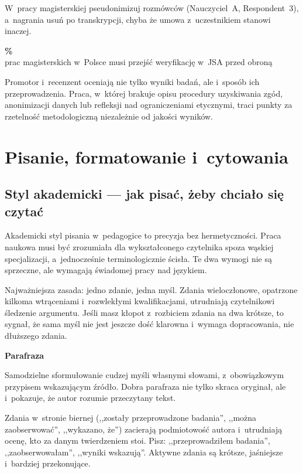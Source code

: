 \documentclass[11pt,a5paper,twoside,openany]{book}
\let\bforigsection\section
\renewcommand{\section}{\needspace{4\baselineskip}\bforigsection}
\newcommand{\bignumber}[2]{%
  \par\vspace{8pt}\noindent\begin{minipage}{\linewidth}\centering
  {\headingfont\bfseries\color{accent}\fontsize{40}{44}\selectfont #1}\\[3pt]
  {\sffamily\small\color{sectioncolor}#2}
  \end{minipage}\vspace{6pt}\par
}
\newcommand{\concept}[2]{%
  \par\vspace{6pt}
  \begin{tcolorbox}[enhanced, breakable, colback=accent!6, colframe=accent,
    boxrule=0pt, leftrule=3.5pt, arc=2pt, drop fuzzy shadow={black!15},
    left=10pt, right=10pt, top=7pt, bottom=7pt, before upper={\parindent0pt}]
    {\sffamily\bfseries\color{accent}#1}\par\vspace{2pt}\small #2
  \end{tcolorbox}\par
}
\begin{document}
 W~pracy magisterskiej pseudonimizuj rozmówców (Nauczyciel~A, Respondent~3), a~nagrania usuń po transkrypcji, chyba że umowa z~uczestnikiem stanowi inaczej.

\bignumber{100\%}{prac magisterskich w~Polsce musi przejść weryfikację w~JSA przed obroną}

\begin{keyinsight}
Promotor i~recenzent oceniają nie tylko wyniki badań, ale i~sposób ich przeprowadzenia. Praca, w~której brakuje opisu procedury uzyskiwania zgód, anonimizacji danych lub refleksji nad ograniczeniami etycznymi, traci punkty za rzetelność metodologiczną niezależnie od jakości wyników.
\end{keyinsight}

\clearpage

\chapter{Pisanie, formatowanie i~cytowania}

\section{Styl akademicki --- jak pisać, żeby chciało się czytać}

Akademicki styl pisania w~pedagogice to precyzja bez hermetyczności. Praca naukowa musi być zrozumiała dla wykształconego czytelnika spoza wąskiej specjalizacji, a~jednocześnie terminologicznie ścisła. Te dwa wymogi nie są sprzeczne, ale wymagają świadomej pracy nad językiem.

Najważniejsza zasada: jedno zdanie, jedna myśl. Zdania wieloczłonowe, opatrzone kilkoma wtrąceniami i~rozwlekłymi kwalifikacjami, utrudniają czytelnikowi śledzenie argumentu. Jeśli masz kłopot z~rozbiciem zdania na dwa krótsze, to sygnał, że sama myśl nie jest jeszcze dość klarowna i~wymaga dopracowania, nie dłuższego zdania.

\concept{Parafraza}{Samodzielne sformułowanie cudzej myśli własnymi słowami, z~obowiązkowym przypisem wskazującym źródło. Dobra parafraza nie tylko skraca oryginał, ale i~pokazuje, że autor rozumie przeczytany tekst.}

\begin{warningbox}
Zdania w~stronie biernej (,,zostały przeprowadzone badania'', ,,można zaobserwować'', ,,wykazano, że'') zacierają podmiotowość autora i~utrudniają ocenę, kto za danym twierdzeniem stoi. Pisz: ,,przeprowadziłem badania'', ,,zaobserwowałam'', ,,wyniki wskazują''. Aktywne zdania są krótsze, jaśniejsze i~bardziej przekonujące.
\end{warningbox}
\end{document}
